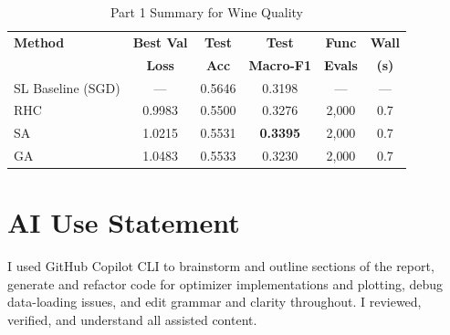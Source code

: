 \documentclass[10 pt, twocolumn]{article}
\begin{document}
\begin{table}[!htbp]
\centering
\caption{Part 1 Summary for Wine Quality}
\footnotesize
\setlength{\tabcolsep}{3.5pt}
\begin{tabular}{lccccc}
\toprule
\textbf{Method} & \textbf{Best Val} & \textbf{Test} & \textbf{Test} & \textbf{Func} & \textbf{Wall} \\
 & \textbf{Loss} & \textbf{Acc} & \textbf{Macro-F1} & \textbf{Evals} & \textbf{(s)} \\
\midrule
SL Baseline (SGD) & --- & 0.5646 & 0.3198 & --- & --- \\
\midrule
RHC & 0.9983 & 0.5500 & 0.3276 & 2{,}000 & 0.7 \\
SA & 1.0215 & 0.5531 & \textbf{0.3395} & 2{,}000 & 0.7 \\
GA & 1.0483 & 0.5533 & 0.3230 & 2{,}000 & 0.7 \\
\bottomrule
\end{tabular}
\end{table}

\section*{AI Use Statement}

I used GitHub Copilot CLI to brainstorm and outline sections of the report, generate and refactor code for optimizer implementations and plotting, debug data-loading issues, and edit grammar and clarity throughout. I reviewed, verified, and understand all assisted content.




\end{document}
